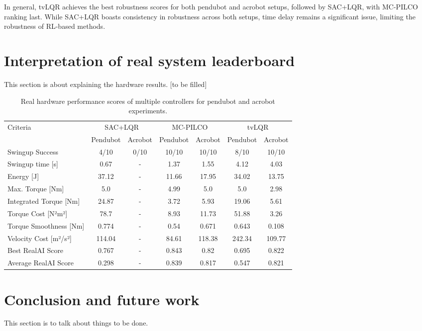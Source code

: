 In general, tvLQR achieves the best robustness scores for both pendubot and acrobot setups, followed by SAC+LQR, with MC-PILCO ranking last. While SAC+LQR boasts consistency in robustness across both setups, time delay remains a significant issue, limiting the robustness of RL-based methods.

\section{Interpretation of real system leaderboard}
This section is about explaining the hardware results. [to be filled]

\begin{table}[H]
  \centering
 \begin{tabular}{lcccccc}
 \hline
 Criteria & \multicolumn{2}{c}{SAC+LQR} & \multicolumn{2}{c}{MC-PILCO} & \multicolumn{2}{c}{tvLQR} \\
 & Pendubot & Acrobot & Pendubot & Acrobot & Pendubot & Acrobot \\
 \hline
 Swingup Success & 4/10 & 0/10 & 10/10 & 10/10 & 8/10 & 10/10 \\
 Swingup time [s] & 0.67 & - & 1.37 & 1.55 & 4.12 & 4.03 \\
 Energy [J] & 37.12 & - & 11.66 & 17.95 & 34.02 & 13.75 \\
 Max. Torque [Nm] & 5.0 & - & 4.99 & 5.0 & 5.0 & 2.98 \\
 Integrated Torque [Nm] & 24.87 & - & 3.72 & 5.93 & 19.06 & 5.61 \\
 Torque Cost [N²m²] & 78.7 & - & 8.93 & 11.73 & 51.88 & 3.26 \\
 Torque Smoothness [Nm] & 0.774 & - & 0.54 & 0.671 & 0.643 & 0.108 \\
 Velocity Cost [m²/s²] & 114.04 & - & 84.61 & 118.38 & 242.34 & 109.77 \\
 Best RealAI Score & 0.767 & - & 0.843 & 0.82 & 0.695 & 0.822 \\
 Average RealAI Score & 0.298 & - & 0.839 & 0.817 & 0.547 & 0.821 \\
 \hline
 \end{tabular}
 \caption{Real hardware performance scores of multiple controllers for pendubot and acrobot experiments.}
 \label{tab:performance}
\end{table}



\section{Conclusion and future work}
This section is to talk about things to be done.

\cleardoublepage
